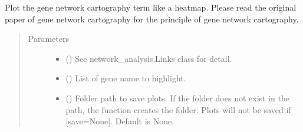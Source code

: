 \documentclass[letterpaper,10pt,english]{sphinxmanual}
\begin{document}
\begin{fulllineitems}
\begin{fulllineitems}
\end{fulllineitems}


\begin{fulllineitems}
\label{\detokenize{modules/celloracle:celloracle.Links.plot_cartography_term}}
Plot the gene network cartography term like a heatmap.
Please read the original paper of gene network cartography for the principle of gene network cartography.
\begin{quote}\begin{description}
\item[{Parameters}] \leavevmode\begin{itemize}
\item {} 
 ({\hyperref[\detokenize{modules/celloracle:celloracle.Links}]{}}) \textendash{} See network\_analysis.Links class for detail.

\item {} 
 () \textendash{} List of gene name to highlight.

\item {} 
 () \textendash{} Folder path to save plots. If the folder does not exist in the path, the function creates the folder.
Plots will not be saved if {[}save=None{]}. Default is None.

\end{itemize}

\end{description}\end{quote}

\end{fulllineitems}



\end{fulllineitems}
\end{document}
